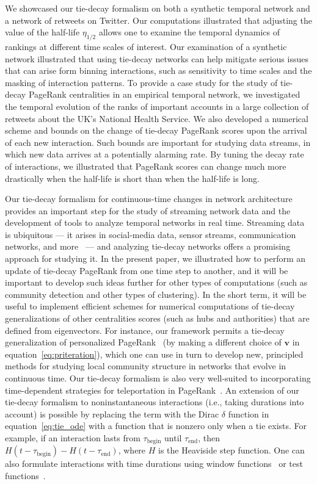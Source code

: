 \documentclass[journal,transmag]{IEEEtran}
\newcommand{\vecb}[1]{\mathbf{#1}}
\begin{document}
We showcased our tie-decay formalism on both a synthetic temporal network and a
network of retweets on Twitter. 
Our computations illustrated that
adjusting the value of the half-life $\eta_{1/2}$
allows one to examine the
temporal dynamics of rankings at different time scales of
interest. Our examination of a synthetic network illustrated that using
tie-decay networks can help mitigate serious issues that can arise form binning interactions, such as
sensitivity to time scales and the masking of interaction
patterns. To provide a case study for the study of tie-decay PageRank
centralities in an empirical temporal network, we investigated the
temporal evolution of the ranks of important accounts in a large collection of
retweets about the UK's National Health Service. 
We also developed a numerical scheme and bounds on the change of tie-decay PageRank scores upon the arrival of each new
interaction. Such bounds are important for studying data streams, in
which new data arrives at a potentially alarming rate. By tuning the
decay rate of interactions, we illustrated that PageRank scores
can change much more drastically when the half-life is short than when the
half-life is long.

Our tie-decay formalism for continuous-time changes in network
architecture provides an important step for the study of streaming
network data and the development of tools to analyze temporal networks
in real time. Streaming data is ubiquitous --- it arises in social-media
data, sensor streams, communication networks, and
more~\cite{Gaber:miningdatastreams,Latapy2017} --- and analyzing
tie-decay networks offers a promising approach for studying it.
In the present paper, we illustrated how to perform an update of tie-decay PageRank from one
time step to another, and it will be important to develop such ideas
further for other types of computations (such as community detection and other types of clustering).
In the short term, it will be useful to implement efficient schemes for numerical computations of tie-decay
generalizations of other centralities scores (such as hubs and
authorities) that are defined from eigenvectors.  For instance, our
framework permits a tie-decay generalization of personalized
PageRank~\cite{Gleich2015,jeub2015} (by making a different choice of $\vecb{v}$ in equation~\eqref{eq:priteration}), which one can use in turn to develop
new, principled methods for studying local community structure in networks
that evolve in continuous time. Our tie-decay formalism is also very
well-suited to incorporating time-dependent strategies for
teleportation in PageRank~\cite{gleich-dynamic}. An extension of our tie-decay
formalism to noninstantaneous interactions (i.e., taking durations
into account) is possible by replacing the term with the Dirac
$\delta$ function in equation~\eqref{eq:tie_ode} with a function that
is nonzero only when a tie exists. For example, if an interaction
lasts from $\tau_{\mathrm{begin}}$ until $\tau_{\mathrm{end}}$, then
$H(t - \tau_{\mathrm{begin}}) - H(t - \tau_{\mathrm{end}})$, where $H$
is the Heaviside step function. One can also formulate interactions
with time durations using window functions~\cite{Weisstein2002} or test
functions~\cite{Howison2003}. 
\end{document}
